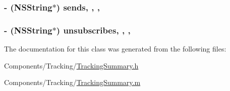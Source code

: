 \hypertarget{interface_tracking_summary_af19c3ebbfee6e05a5d972f68cbd9459a}{
\subsubsection[{sends}]{\setlength{\rightskip}{0pt plus 5cm}-\/ (N\-S\-String$\ast$) sends\hspace{0.3cm}{\ttfamily [read]}, {\ttfamily [write]}, {\ttfamily [nonatomic]}, {\ttfamily [strong]}}}\label{interface_tracking_summary_af19c3ebbfee6e05a5d972f68cbd9459a}
\hypertarget{interface_tracking_summary_a60ccd3e839a9cb9d7d2254fb3bee1c78}{
\subsubsection[{unsubscribes}]{\setlength{\rightskip}{0pt plus 5cm}-\/ (N\-S\-String$\ast$) unsubscribes\hspace{0.3cm}{\ttfamily [read]}, {\ttfamily [write]}, {\ttfamily [nonatomic]}, {\ttfamily [strong]}}}\label{interface_tracking_summary_a60ccd3e839a9cb9d7d2254fb3bee1c78}


The documentation for this class was generated from the following files\-:\begin{DoxyCompactItemize}
\item 
Components/\-Tracking/\hyperlink{_tracking_summary_8h}{Tracking\-Summary.\-h}\item 
Components/\-Tracking/\hyperlink{_tracking_summary_8m}{Tracking\-Summary.\-m}\end{DoxyCompactItemize}
